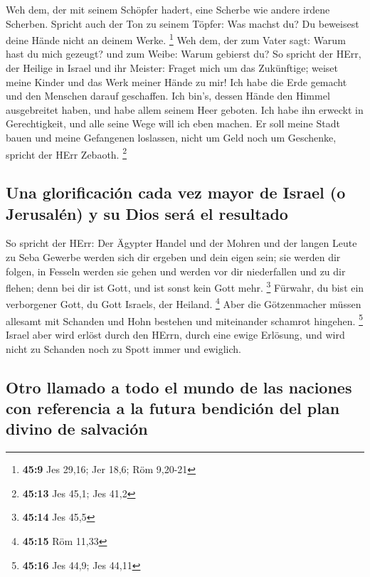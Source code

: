  Weh dem, der mit seinem Schöpfer hadert, eine Scherbe wie
andere irdene Scherben. Spricht auch der Ton zu seinem Töpfer: Was
machst du? Du beweisest deine Hände nicht an deinem Werke. \footnote{\textbf{45:9}
  Jes 29,16; Jer 18,6; Röm 9,20-21}  Weh dem, der zum
Vater sagt: Warum hast du mich gezeugt? und zum Weibe: Warum gebierst
du?  So spricht der HErr, der Heilige in Israel und ihr
Meister: Fraget mich um das Zukünftige; weiset meine Kinder und das Werk
meiner Hände zu mir!  Ich habe die Erde gemacht und den
Menschen darauf geschaffen. Ich bin's, dessen Hände den Himmel
ausgebreitet haben, und habe allem seinem Heer geboten. 
Ich habe ihn erweckt in Gerechtigkeit, und alle seine Wege will ich eben
machen. Er soll meine Stadt bauen und meine Gefangenen loslassen, nicht
um Geld noch um Geschenke, spricht der HErr Zebaoth. \footnote{\textbf{45:13}
  Jes 45,1; Jes 41,2}

\hypertarget{una-glorificaciuxf3n-cada-vez-mayor-de-israel-o-jerusaluxe9n-y-su-dios-seruxe1-el-resultado}{%
\subsection{Una glorificación cada vez mayor de Israel (o Jerusalén) y
su Dios será el
resultado}\label{una-glorificaciuxf3n-cada-vez-mayor-de-israel-o-jerusaluxe9n-y-su-dios-seruxe1-el-resultado}}

 So spricht der HErr: Der Ägypter Handel und der Mohren
und der langen Leute zu Seba Gewerbe werden sich dir ergeben und dein
eigen sein; sie werden dir folgen, in Fesseln werden sie gehen und
werden vor dir niederfallen und zu dir flehen; denn bei dir ist Gott,
und ist sonst kein Gott mehr. \footnote{\textbf{45:14} Jes 45,5}
 Fürwahr, du bist ein verborgener Gott, du Gott Israels,
der Heiland. \footnote{\textbf{45:15} Röm 11,33}  Aber
die Götzenmacher müssen allesamt mit Schanden und Hohn bestehen und
miteinander schamrot hingehen. \footnote{\textbf{45:16} Jes 44,9; Jes
  44,11}  Israel aber wird erlöst durch den HErrn, durch
eine ewige Erlösung, und wird nicht zu Schanden noch zu Spott immer und
ewiglich.

\hypertarget{otro-llamado-a-todo-el-mundo-de-las-naciones-con-referencia-a-la-futura-bendiciuxf3n-del-plan-divino-de-salvaciuxf3n}{%
\subsection{Otro llamado a todo el mundo de las naciones con referencia
a la futura bendición del plan divino de
salvación}\label{otro-llamado-a-todo-el-mundo-de-las-naciones-con-referencia-a-la-futura-bendiciuxf3n-del-plan-divino-de-salvaciuxf3n}}

